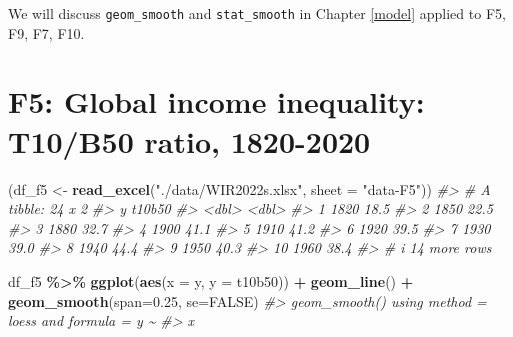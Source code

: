 \documentclass[
  xelatex, ja=standard]{bxjsbook}
\newenvironment{Shaded}{\begin{snugshade}}{\end{snugshade}}
\newcommand{\AttributeTok}[1]{\textcolor[rgb]{0.13,0.29,0.53}{#1}}
\newcommand{\CommentTok}[1]{\textcolor[rgb]{0.56,0.35,0.01}{\textit{#1}}}
\newcommand{\ConstantTok}[1]{\textcolor[rgb]{0.56,0.35,0.01}{#1}}
\newcommand{\FloatTok}[1]{\textcolor[rgb]{0.00,0.00,0.81}{#1}}
\newcommand{\FunctionTok}[1]{\textcolor[rgb]{0.13,0.29,0.53}{\textbf{#1}}}
\newcommand{\NormalTok}[1]{#1}
\newcommand{\OtherTok}[1]{\textcolor[rgb]{0.56,0.35,0.01}{#1}}
\newcommand{\SpecialCharTok}[1]{\textcolor[rgb]{0.81,0.36,0.00}{\textbf{#1}}}
\newcommand{\StringTok}[1]{\textcolor[rgb]{0.31,0.60,0.02}{#1}}
\theoremstyle{definition}
\theoremstyle{definition}
\theoremstyle{definition}
\theoremstyle{definition}
\theoremstyle{remark}
\begin{document}
We will discuss \texttt{geom\_smooth} and \texttt{stat\_smooth} in Chapter \ref{model} applied to F5, F9, F7, F10.

\hypertarget{f5-global-income-inequality-t10b50-ratio-1820-2020}{%
\section{F5: Global income inequality: T10/B50 ratio, 1820-2020}\label{f5-global-income-inequality-t10b50-ratio-1820-2020}}

\begin{Shaded}
\begin{Highlighting}[]
\NormalTok{(df\_f5 }\OtherTok{\textless{}{-}} \FunctionTok{read\_excel}\NormalTok{(}\StringTok{"./data/WIR2022s.xlsx"}\NormalTok{, }\AttributeTok{sheet =} \StringTok{"data{-}F5"}\NormalTok{))}
\CommentTok{\#\textgreater{} \# A tibble: 24 x 2}
\CommentTok{\#\textgreater{}        y t10b50}
\CommentTok{\#\textgreater{}    \textless{}dbl\textgreater{}  \textless{}dbl\textgreater{}}
\CommentTok{\#\textgreater{}  1  1820   18.5}
\CommentTok{\#\textgreater{}  2  1850   22.5}
\CommentTok{\#\textgreater{}  3  1880   32.7}
\CommentTok{\#\textgreater{}  4  1900   41.1}
\CommentTok{\#\textgreater{}  5  1910   41.2}
\CommentTok{\#\textgreater{}  6  1920   39.5}
\CommentTok{\#\textgreater{}  7  1930   39.0}
\CommentTok{\#\textgreater{}  8  1940   44.4}
\CommentTok{\#\textgreater{}  9  1950   40.3}
\CommentTok{\#\textgreater{} 10  1960   38.4}
\CommentTok{\#\textgreater{} \# i 14 more rows}
\end{Highlighting}
\end{Shaded}

\begin{Shaded}
\begin{Highlighting}[]
\NormalTok{df\_f5 }\SpecialCharTok{\%\textgreater{}\%} \FunctionTok{ggplot}\NormalTok{(}\FunctionTok{aes}\NormalTok{(}\AttributeTok{x =}\NormalTok{ y, }\AttributeTok{y =}\NormalTok{ t10b50)) }\SpecialCharTok{+} \FunctionTok{geom\_line}\NormalTok{() }\SpecialCharTok{+} \FunctionTok{geom\_smooth}\NormalTok{(}\AttributeTok{span=}\FloatTok{0.25}\NormalTok{, }\AttributeTok{se=}\ConstantTok{FALSE}\NormalTok{)}
\CommentTok{\#\textgreater{} \textasciigrave{}geom\_smooth()\textasciigrave{} using method = \textquotesingle{}loess\textquotesingle{} and formula = \textquotesingle{}y \textasciitilde{}}
\CommentTok{\#\textgreater{} x\textquotesingle{}}
\end{Highlighting}
\end{Shaded}
\end{document}
